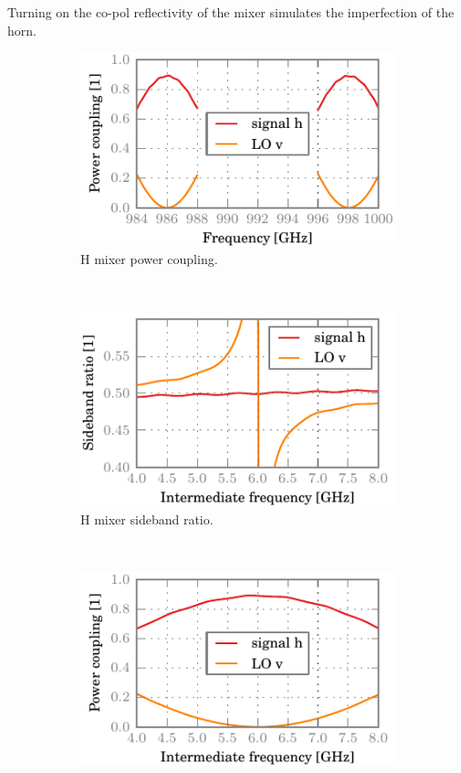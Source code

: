 Turning on the co-pol reflectivity of the mixer simulates the imperfection of the horn.
\begin{figure}[hbtp]
    \centering
    \begin{subfigure}[b]{.5\textwidth}
        \includegraphics{chapter_3/04_mh_co_h_dsb}%
        \caption{H mixer power coupling.}
    \end{subfigure}%
    \\
    \begin{subfigure}[b]{.5\textwidth}
        \includegraphics{chapter_3/04_mh_co_h_sbr}%
        \caption{H mixer sideband ratio.}
    \end{subfigure}%
    \\
    \begin{subfigure}[b]{.5\textwidth}
        \includegraphics{chapter_3/04_mh_co_h_ssb}%

\end{subfigure}
\end{figure}
